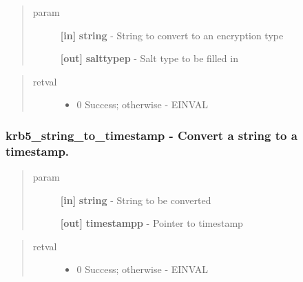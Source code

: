\documentclass[letterpaper,10pt,english]{sphinxmanual}
\begin{document}
\begin{quote}\begin{description}
\item[{param}] \leavevmode
\textbf{{[}in{]}} \textbf{string} - String to convert to an encryption type

\textbf{{[}out{]}} \textbf{salttypep} - Salt type to be filled in

\end{description}\end{quote}
\begin{quote}\begin{description}
\item[{retval}] \leavevmode\begin{itemize}
\item {} 
0   Success; otherwise - EINVAL

\end{itemize}

\end{description}\end{quote}


\subsubsection{krb5\_string\_to\_timestamp -  Convert a string to a timestamp.}
\label{appdev/refs/api/krb5_string_to_timestamp::doc}\label{appdev/refs/api/krb5_string_to_timestamp:krb5-string-to-timestamp-convert-a-string-to-a-timestamp}

\begin{fulllineitems}
\label{appdev/refs/api/krb5_string_to_timestamp:c.krb5_string_to_timestamp}
\end{fulllineitems}

\begin{quote}\begin{description}
\item[{param}] \leavevmode
\textbf{{[}in{]}} \textbf{string} - String to be converted

\textbf{{[}out{]}} \textbf{timestampp} - Pointer to timestamp

\end{description}\end{quote}
\begin{quote}\begin{description}
\item[{retval}] \leavevmode\begin{itemize}
\item {} 
0   Success; otherwise - EINVAL

\end{itemize}

\end{description}\end{quote}
\end{document}
